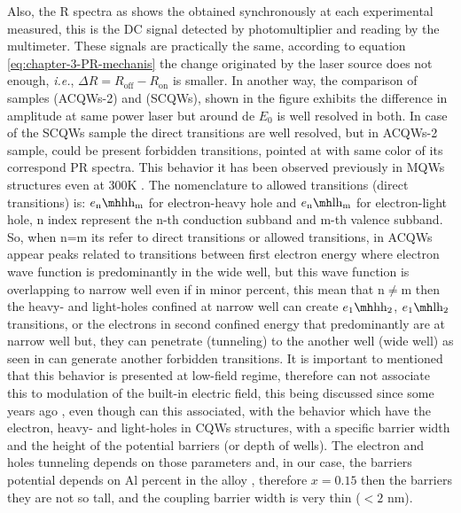 Also, the \gls{R} spectra as shows the   obtained synchronously at each experimental measured, this is the DC signal detected by photomultiplier and reading by the multimeter. These signals are practically the same, according to equation \cref{eq:chapter-3-PR-mechanis}  the change originated by the laser source does not enough, \textit{i.e.}, $\Delta R= R_{\mathrm{off}}- R_{\mathrm{on}}$ is smaller. 
In another way, the comparison of samples  (ACQWs-2) and  (SCQWs), shown in the figure  exhibits the difference in amplitude at same power laser but around de $E_0$ is well resolved in both. In case of the SCQWs sample  the direct transitions are well resolved, but in ACQWs-2 sample, could be present forbidden transitions, pointed at  with same color of its correspond PR spectra. This behavior it has been observed previously\cite{fox1991excitonic} in MQWs structures even at 300K \cite{shen1986observation}. The nomenclature to allowed transitions  (direct transitions) is: $\thh{\text{n}}{\text{m}}$ for electron-heavy hole and  $\tlh{\text{n}}{\text{m}}$ for electron-light hole, n index represent the n-th conduction subband and m-th  valence subband. So, when n=m its refer to direct transitions or allowed transitions, in ACQWs appear peaks related to transitions between first electron energy where electron wave function is predominantly in the wide well, but this wave function is overlapping to narrow well even if in minor percent, this mean that $\mathrm{n\neq m} $ then the heavy- and light-holes confined at narrow well can create $\thh{1}{2}$,  $\tlh{1}{2}$ transitions, or the electrons in second confined energy that  predominantly  are at narrow well but, they can penetrate (tunneling)   to the  another well (wide well) as seen in     can generate  another forbidden transitions. 
It is important to mentioned that this behavior is presented at low-field regime, therefore can not associate this to modulation of the built-in electric field, this being discussed since some years ago \cite{shen1986observation,shen1987photoreflectance}, even though can this associated, with the behavior which have the  electron, heavy- and light-holes in CQWs structures, with a specific barrier width and the height of the potential barriers  (or depth of wells)\cite{fang1988allowed,sivalertporn2016effectofbarrier}. The electron and holes tunneling depends on those parameters and, in our case, the barriers potential depends on Al percent in the alloy \algaas, therefore $x=0.15$ then the barriers they are not so tall, and the coupling barrier width is very thin ($< 2$ nm). \\
